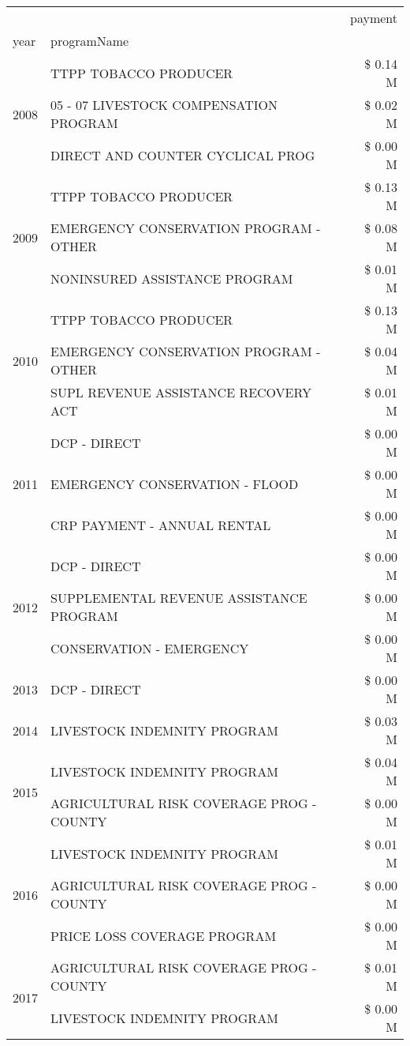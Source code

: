 \begin{tabular}{llr}
\toprule
 &  & payment \\
year & programName &  \\
\midrule
\multirow[t]{3}{*}{2008} & TTPP TOBACCO PRODUCER & \$ 0.14 M \\
 & 05 - 07 LIVESTOCK COMPENSATION PROGRAM & \$ 0.02 M \\
 & DIRECT AND COUNTER CYCLICAL PROG & \$ 0.00 M \\
\cline{1-3}
\multirow[t]{3}{*}{2009} & TTPP TOBACCO PRODUCER & \$ 0.13 M \\
 & EMERGENCY CONSERVATION PROGRAM - OTHER & \$ 0.08 M \\
 & NONINSURED ASSISTANCE PROGRAM & \$ 0.01 M \\
\cline{1-3}
\multirow[t]{3}{*}{2010} & TTPP TOBACCO PRODUCER & \$ 0.13 M \\
 & EMERGENCY CONSERVATION PROGRAM - OTHER & \$ 0.04 M \\
 & SUPL REVENUE ASSISTANCE RECOVERY ACT & \$ 0.01 M \\
\cline{1-3}
\multirow[t]{3}{*}{2011} & DCP - DIRECT & \$ 0.00 M \\
 & EMERGENCY CONSERVATION - FLOOD & \$ 0.00 M \\
 & CRP PAYMENT - ANNUAL RENTAL & \$ 0.00 M \\
\cline{1-3}
\multirow[t]{3}{*}{2012} & DCP - DIRECT & \$ 0.00 M \\
 & SUPPLEMENTAL REVENUE ASSISTANCE PROGRAM & \$ 0.00 M \\
 & CONSERVATION - EMERGENCY & \$ 0.00 M \\
\cline{1-3}
2013 & DCP - DIRECT & \$ 0.00 M \\
\cline{1-3}
2014 & LIVESTOCK INDEMNITY PROGRAM & \$ 0.03 M \\
\cline{1-3}
\multirow[t]{2}{*}{2015} & LIVESTOCK INDEMNITY PROGRAM & \$ 0.04 M \\
 & AGRICULTURAL RISK COVERAGE PROG - COUNTY & \$ 0.00 M \\
\cline{1-3}
\multirow[t]{3}{*}{2016} & LIVESTOCK INDEMNITY PROGRAM & \$ 0.01 M \\
 & AGRICULTURAL RISK COVERAGE PROG - COUNTY & \$ 0.00 M \\
 & PRICE LOSS COVERAGE PROGRAM & \$ 0.00 M \\
\cline{1-3}
\multirow[t]{3}{*}{2017} & AGRICULTURAL RISK COVERAGE PROG - COUNTY & \$ 0.01 M \\
 & LIVESTOCK INDEMNITY PROGRAM & \$ 0.00 M \\

\end{tabular}
